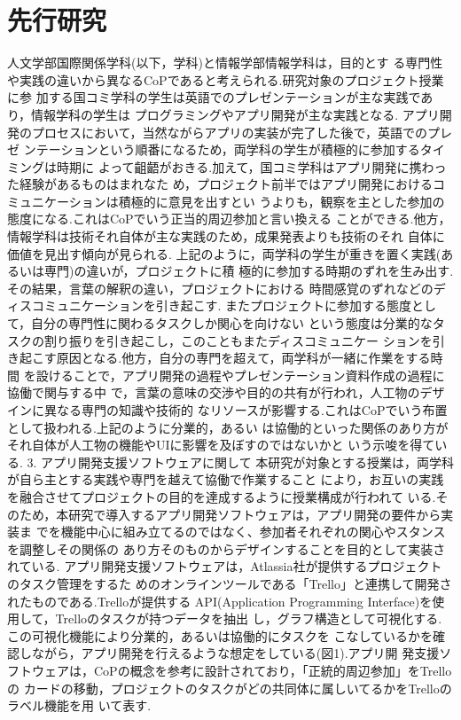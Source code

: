 \documentclass[submit,techrep]{ipsj}
\begin{document}
\section{先行研究}

人文学部国際関係学科(以下，学科)と情報学部情報学科は，目的とす る専門性や実践の違いから異なるCoPであると考えられる.研究対象のプロジェクト授業に参 加する国コミ学科の学生は英語でのプレゼンテーションが主な実践であり，情報学科の学生は プログラミングやアプリ開発が主な実践となる.  アプリ開発のプロセスにおいて，当然ながらアプリの実装が完了した後で，英語でのプレゼ ンテーションという順番になるため，両学科の学生が積極的に参加するタイミングは時期に よって齟齬がおきる.加えて，国コミ学科はアプリ開発に携わった経験があるものはまれなた め，プロジェクト前半ではアプリ開発におけるコミュニケーションは積極的に意見を出すとい うよりも，観察を主とした参加の態度になる.これはCoPでいう正当的周辺参加と言い換える ことができる.他方，情報学科は技術それ自体が主な実践のため，成果発表よりも技術のそれ 自体に価値を見出す傾向が見られる.  上記のように，両学科の学生が重きを置く実践(あるいは専門)の違いが，プロジェクトに積 極的に参加する時期のずれを生み出す.その結果，言葉の解釈の違い，プロジェクトにおける 時間感覚のずれなどのディスコミュニケーションを引き起こす.  またプロジェクトに参加する態度として，自分の専門性に関わるタスクしか関心を向けない という態度は分業的なタスクの割り振りを引き起こし，このこともまたディスコミュニケー ションを引き起こす原因となる.他方，自分の専門を超えて，両学科が一緒に作業をする時間 を設けることで，アプリ開発の過程やプレゼンテーション資料作成の過程に協働で関与する中 で，言葉の意味の交渉や目的の共有が行われ，人工物のデザインに異なる専門の知識や技術的 なリソースが影響する.これはCoPでいう布置として扱われる.上記のように分業的，あるい は協働的といった関係のあり方がそれ自体が人工物の機能やUIに影響を及ぼすのではないかと いう示唆を得ている.
3. アプリ開発支援ソフトウェアに関して  本研究が対象とする授業は，両学科が自ら主とする実践や専門を越えて協働で作業すること により，お互いの実践を融合させてプロジェクトの目的を達成するように授業構成が行われて いる.そのため，本研究で導入するアプリ開発ソフトウェアは，アプリ開発の要件から実装ま でを機能中心に組み立てるのではなく、参加者それぞれの関心やスタンスを調整しその関係の あり方そのものからデザインすることを目的として実装されている.
 アプリ開発支援ソフトウェアは，Atlassia社が提供するプロジェクトのタスク管理をするた めのオンラインツールである「Trello」と連携して開発されたものである.Trelloが提供する API(Application Programming Interface)を使用して，Trelloのタスクが持つデータを抽出 し，グラフ構造として可視化する.この可視化機能により分業的，あるいは協働的にタスクを こなしているかを確認しながら，アプリ開発を行えるような想定をしている(図1).アプリ開 発支援ソフトウェアは，CoPの概念を参考に設計されており，「正統的周辺参加」をTrelloの カードの移動，プロジェクトのタスクがどの共同体に属しいてるかをTrelloのラベル機能を用 いて表す.
\end{document}
